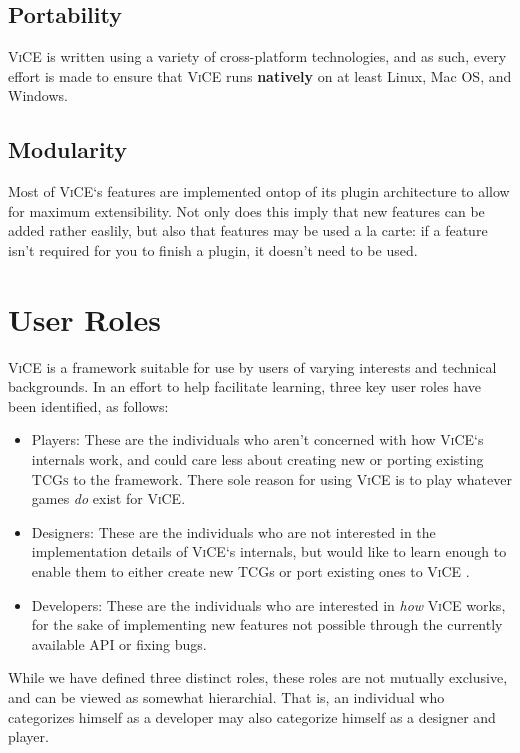\documentclass[letterpaper,10pt,english]{sphinxmanual}
\begin{document}
\section{Portability}
\label{index:portability}
\textsc{ViCE} is written using a variety of
cross-platform technologies, and as such, every effort is made to ensure that
\textsc{ViCE} runs \textbf{natively} on at least Linux,
Mac OS, and Windows.


\section{Modularity}
\label{index:modularity}
Most of \textsc{ViCE}`s features are implemented ontop
of its plugin architecture to allow for maximum extensibility. Not only does
this imply that new features can be added rather easlily, but also that features
may be used a la carte: if a feature isn't required for you to finish a plugin,
it doesn't need to be used.


\chapter{User Roles}
\label{index:user-roles}
\textsc{ViCE} is a framework suitable for use by users
of varying interests and technical backgrounds. In an effort to help facilitate
learning, three key user roles have been identified, as follows:
\begin{itemize}
\item {} 
Players: These are the individuals who aren't concerned with how
\textsc{ViCE}`s internals work, and could care less
about creating new or porting existing \textsc{TCGs} to
the framework. There sole reason for using
\textsc{ViCE} is to play whatever games \emph{do}
exist for \textsc{ViCE}.

\item {} 
Designers: These are the individuals who are not interested in the
implementation details of \textsc{ViCE}`s internals,
but would like to learn enough to enable them to either create new TCGs or
port existing ones to \textsc{ViCE} .

\item {} 
Developers: These are the individuals who are interested in \emph{how}
\textsc{ViCE} works, for the sake of implementing
new features not possible through the currently available API or fixing bugs.

\end{itemize}

While we have defined three distinct roles, these roles are not mutually
exclusive, and can be viewed as somewhat hierarchial. That is, an individual
who categorizes himself as a developer may also categorize himself as a
designer and player.
\end{document}
